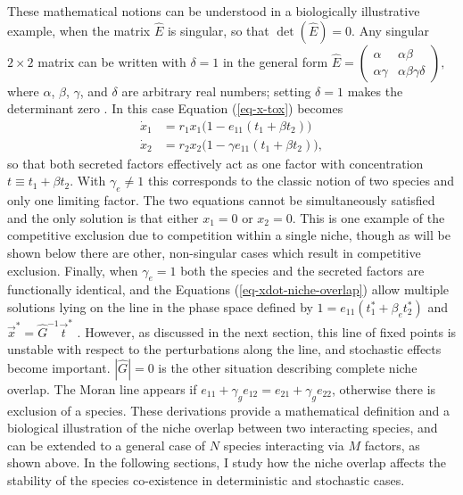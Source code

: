 These mathematical notions can be understood in a biologically illustrative example, when the matrix $\hat{E}$ is singular, so that $\det(\hat{E})=0$. 
Any singular $2\times 2$ matrix can be written with $\delta=1$ in the general form  $\hat{E}=\begin{pmatrix}
\alpha   & \alpha\beta \\
\alpha\gamma & \alpha\beta\gamma\delta
\end{pmatrix},$
where $\alpha$, $\beta$, $\gamma$, and $\delta$ are arbitrary real numbers; setting $\delta=1$ makes the determinant zero \cite{Larson2016}. 
In this case Equation (\ref{eq-x-tox}) becomes
\begin{align}
\dot{x}_1 &= r_1 x_1\big(1 -        e_{11}\left( t_1 + \beta t_2 \right) \big) \\
\dot{x}_2 &= r_2 x_2\big(1 - \gamma e_{11}\left( t_1 + \beta t_2 \right) \big),
\label{eq-xdot-niche-overlap}
\end{align}
so that both secreted factors effectively act as one factor with concentration $t\equiv t_1 + \beta t_2$. With $\gamma_e\neq 1$ this corresponds to the classic notion of two species and only one limiting factor. The two equations cannot be simultaneously satisfied and the only solution is that either $x_1=0$ or $x_2=0$. This is one example of the competitive exclusion due to competition within a single niche, though as will be shown below there are other, non-singular cases which result in competitive exclusion.
Finally, when $\gamma_e=1$ both the species and the secreted factors are functionally identical, and the Equations (\ref{eq-xdot-niche-overlap}) allow multiple solutions lying on the line in the phase space defined by $1=e_{11}\left( t_1^* + \beta_e t_2^* \right)$ and $\vec{x}^*=\hat{G}^{-1}\vec{t}^*$ \cite{McGehee1977a,Constable2015}. However, as discussed in the next section, this line of fixed points is unstable with respect to the perturbations along the line, and stochastic effects become important.
$|\hat{G}|=0$ is the other situation describing complete niche overlap. The Moran line appears if $e_{11}+\gamma_ge_{12}=e_{21}+\gamma_ge_{22}$, otherwise there is exclusion of a species. %
These derivations provide a mathematical definition and a biological illustration of the niche overlap between two interacting species, and can be extended to a general case of $N$ species interacting via $M$ factors, as shown above. 
In the following sections, I study how the niche overlap affects the stability of the species co-existence in deterministic and stochastic cases.


